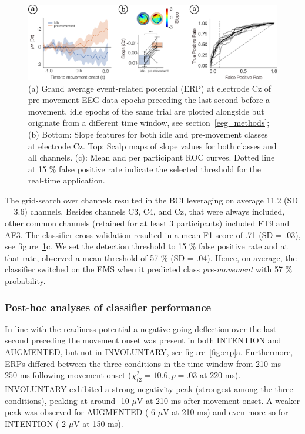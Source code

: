 \begin{figure}[t]
    \centering
    \includegraphics[width=\textwidth]{figures/eeg_results_new.pdf}
    \caption{(a) Grand average event-related potential (ERP) at electrode Cz of pre-movement EEG data epochs preceding the last second before a movement, idle epochs of the same trial are plotted alongside but originate from a different time window, see section~\ref{eeg_methods}; (b) Bottom: Slope features for both idle and pre-movement classes at electrode Cz. Top: Scalp maps of slope values for both classes and all channels. (c): Mean and per participant ROC curves. Dotted line at 15 \% false positive rate indicate the selected threshold for the real-time application.}
    \label{fig:EEG_results}
\end{figure}

The grid-search over channels resulted in the BCI leveraging on average 11.2 (SD = 3.6) channels. Besides channels C3, C4, and Cz, that were always included, other common channels (retained for at least 3 participants) included FT9 and AF3. The classifier cross-validation resulted in a mean F1 score of .71 (SD = .03), see figure~\ref{fig:EEG_results}c. We set the detection threshold to 15 \% false positive rate and at that rate, observed a mean threshold of 57 \% (SD = .04). Hence, on average, the classifier switched on the EMS when it predicted class \textit{pre-movement} with 57 \% probability.

\subsubsection{Post-hoc analyses of classifier performance}

In line with the readiness potential a negative going deflection over the last second preceding the movement onset was present in both INTENTION and AUGMENTED, but not in INVOLUNTARY, see figure~\ref{fig:erp}a. Furthermore, ERPs differed between the three conditions in the time window from 210 ms -- 250 ms following movement onset ($\chi^{2}_{(2} = 10.6, p = .03$ at 220 ms). INVOLUNTARY exhibited a strong negativity peak (strongest among the three conditions), peaking at around -10 $\mu$V at 210 ms after movement onset. A weaker peak was observed for AUGMENTED (-6 $\mu$V at 210 ms) and even more so for INTENTION (-2 $\mu$V at 150 ms).

